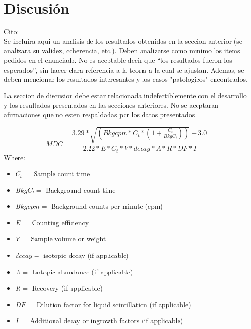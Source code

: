 \documentclass[double,12pt]{beavtex}
\begin{document}
{%

\chapter{Discusi\'on}

Cito: \\

Se incluira aqui un analisis de los resultados obtenidos en la seccion anterior (se analizara
su validez, coherencia, etc.). Deben analizarse como mınimo los items pedidos en el
enunciado. No es aceptable decir que “los resultados fueron los esperados”, sin hacer
clara referencia a la teorıa a la cual se ajustan. Ademas, se deben mencionar los resultados interesantes y los casos "patologicos" encontrados.

La seccion de discusion debe estar relacionada indefectiblemente con el desarrollo y los
resultados presentados en las secciones anteriores. No se aceptaran afirmaciones que no esten
respaldadas por los datos presentados


\begin{equation}
MDC=\frac{3.29*\sqrt{(Bkgcpm*C_{t}*(1+\frac{C_{t}}{BkgC_{t}}))}+3.0}{2.22*E*C_{t}*V*decay*A*R*DF*I}
\label{eq:mdc}
\end{equation}
Where:

\begin{itemize}
\item $C_{t} =$ Sample count time
\item $BkgC_{t} =$ Background count time
\item $Bkgcpm =$ Background counts per minute (cpm)
\item $E =$ Counting efficiency
\item $V =$ Sample volume or weight
\item $decay =$ isotopic decay (if applicable)
\item $A =$ Isotopic abundance (if applicable)
\item $R =$ Recovery (if applicable)
\item $DF =$ Dilution factor for liquid scintillation (if applicable)
\item $I =$ Additional decay or ingrowth factors (if applicable)
\end{itemize}




\pagebreak[4]

}
\end{document}

